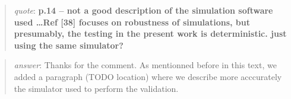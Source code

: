 \documentclass[a4paper]{article}
\newcommand\quot[1]{\begin{quote} \textit{quote}: \textbf{#1}\end{quote}}
\newcommand\as[1]{\begin{quote} \textit{answer}: {#1}\end{quote} \leavevmode \\ }
\begin{document}
\quot{p.14 – not a good description of the simulation software used \dots Ref [38] focuses on robustness of simulations, but presumably, the testing in the present work is deterministic.
 just using the same simulator? }
\as{Thanks for the comment. As mentionned before in this text, we added a paragraph (TODO location) where we describe more acccurately the simulator used to perform the validation.}
\end{document}
